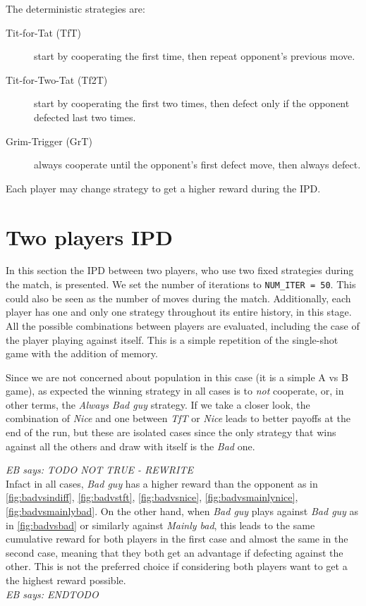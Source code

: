 \documentclass[journal,a4paper,10pt,twoside]{IEEEtran}
\newcommand{\EB}[1]{\textit{\color{blue}EB says: #1}}
\begin{document}
The deterministic strategies are:
\begin{description}
    \item[Tit-for-Tat (TfT)] start by cooperating the first time, then repeat opponent's previous move.
    \item[Tit-for-Two-Tat (Tf2T)] start by cooperating the first two times, then defect only if the opponent defected last two times.
    \item[Grim-Trigger (GrT)] always cooperate until the opponent's first defect move, then always defect. 
\end{description}

Each player may change strategy to get a higher reward during the IPD.

\section{Two players IPD} \label{s:IPD2P}
In this section the IPD between two players, who use two fixed strategies during the match, is presented.
We set the number of iterations to \texttt{NUM\_ITER = 50}. This could also be seen as the number of moves during the match.
Additionally, each player has one and only one strategy throughout its entire history, in this stage.
All the possible combinations between players are evaluated, including the case of the player playing against itself.
This is a simple repetition of the single-shot game with the addition of memory.

Since we are not concerned about population in this case (it is a simple A vs B game), as expected the winning strategy in all cases is to \textit{not} cooperate, or, in other terms, the \textit{Always Bad guy} strategy.
If we take a closer look, the combination of \textit{Nice} and one between \textit{TfT} or \textit{Nice} leads to better payoffs at the end of the run, but these are isolated cases since the only strategy that wins against all the others and draw with itself is the \textit{Bad} one.

\EB{TODO NOT TRUE - REWRITE}\\
Infact in all cases, \textit{Bad guy} has a higher reward than the opponent as in \autoref{fig:badvsindiff}, \autoref{fig:badvstft}, \autoref{fig:badvsnice}, \autoref{fig:badvsmainlynice}, \autoref{fig:badvsmainlybad}. 
On the other hand, when \textit{Bad guy} plays against \textit{Bad guy} as in \autoref{fig:badvsbad} or similarly against \textit{Mainly bad}, this leads to the same cumulative reward for both players in the first case and almost the same in the second case, meaning that they both get an advantage if defecting against the other. This is not the preferred choice if considering both players want to get a the highest reward possible.\\
\EB{ENDTODO}
\end{document}
